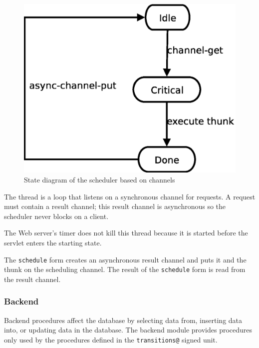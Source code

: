 \documentclass[a4paper]{article}
\begin{document}
\begin{figure}[ht]
\centering
\includegraphics[scale=.30]{channel.eps}
\caption{State diagram of the scheduler based on channels}
\label{fig:channel}
\end{figure}

The thread is a loop that listens on a synchronous channel for requests. A
request must contain a result channel; this result channel is asynchronous so
the scheduler never blocks on a client.

The Web server's timer does not kill this thread because it is started before
the servlet enters the starting state. 

The \verb|schedule| form creates an asynchronous result channel and puts it and
the thunk on the scheduling channel. The result of the \verb|schedule| form is
read from the result channel.


\subsubsection{Backend}\label{subsubsec:backend}

Backend procedures affect the database by selecting data from, inserting data
into, or updating data in the database. The backend module provides procedures
only used by the procedures defined in the \verb|transitions@| signed unit.
\end{document}
